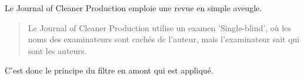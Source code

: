 Le Journal of Cleaner Production emploie une revue en simple aveugle.
\blockcquote[traduction]{elsevier__-_journal_of_cleaner_production_guide_????}
{
Le Journal of Cleaner Production utilise un examen 'Single-blind', où les noms des examinateurs sont cachés de l'auteur, mais l'examinateur sait qui sont les auteurs.
}
C'est donc le principe du filtre en amont qui est appliqué.
%
%
{%
%
%
%
%
%
%
}
